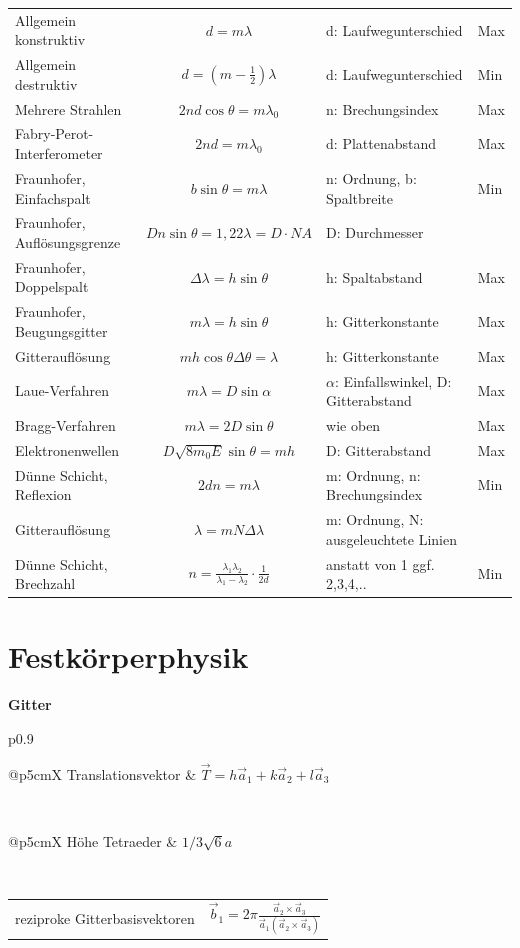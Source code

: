 \documentclass[12pt,a4paper, twoside]{article}
\makeatletter
\renewcommand{\=}[1]{\stackrel{#1}{=}}
\theoremstyle{definition}
\theoremstyle{remark}
\newcommand{\concept}[2]{%
\noindent
\begin{framed}
\noindent\textbf{#1}
\par\begin{tabular}{p{0.9\linewidth}}
#2
\end{tabular}
\end{framed}
}
\newcommand{\f}[2]{%
\noindent\begin{tabularx}{\linewidth}{@{}p{5cm}X}
#1 & $#2$
\end{tabularx}}
\makeatother
\begin{document}
\begin{center}
\begin{framed}
	\begin{tabular}{lcll}
	Allgemein konstruktiv & $d = m\lambda$ & d: Laufwegunterschied & Max\\
	Allgemein destruktiv & $d = (m-\frac{1}{2})\lambda$ & d: Laufwegunterschied & Min\\
	Mehrere Strahlen & $2nd \cos \theta = m \lambda_0$ &n: Brechungsindex & Max\\
	Fabry-Perot-Interferometer & $2nd = m \lambda_0$ & d: Plattenabstand & Max\\
	Fraunhofer, Einfachspalt & $b \sin \theta = m \lambda$ & n: Ordnung, b: Spaltbreite & Min\\
	Fraunhofer, Auflösungsgrenze & $D n \sin \theta = 1,22 \lambda  = D \cdot NA $ & D: Durchmesser & \\
	Fraunhofer, Doppelspalt & $\Delta \lambda = h \sin \theta$ & h: Spaltabstand & Max\\
	Fraunhofer, Beugungsgitter & $m \lambda = h \sin \theta$ & h: Gitterkonstante & Max\\
	Gitterauflösung & $m h \cos \theta \Delta \theta = \lambda$ & h: Gitterkonstante & Max\\
	Laue-Verfahren & $m \lambda = D \sin \alpha$ & $\alpha$: Einfallswinkel, D: Gitterabstand & Max\\
	Bragg-Verfahren & $m \lambda = 2D \sin \theta$ & wie oben & Max\\
	Elektronenwellen & $D \sqrt{8m_0 E} \sin \theta = mh$ & D: Gitterabstand & Max\\
	Dünne Schicht, Reflexion & $2dn = m \lambda$ & m: Ordnung, n: Brechungsindex & Min\\
	Gitterauflösung & $\lambda = mN \Delta \lambda$ & m: Ordnung, N: ausgeleuchtete Linien & \\
	Dünne Schicht, Brechzahl & $n = \frac{\lambda_1 \lambda_2}{\lambda_1 - \lambda_2} \cdot \frac{1}{2d}$ & anstatt von 1 ggf. 2,3,4,.. & Min \\
	\end{tabular}
\end{framed}
\end{center}

\newpage
\section{Festkörperphysik}

\concept{Gitter}{
\f{Translationsvektor}{\vec T = h \vec a_1 + k \vec a_2 + l \vec a_3}\\
\f{Höhe Tetraeder}{1/3 \sqrt{6} a}\\
\f{reziproke Gitterbasisvektoren}{\vec b_1 = 2\pi \frac{\vec a_2 \times \vec a_3}{\vec a_1 ( \vec a_2 \times \vec a_3)}}\\
}
\end{document}
